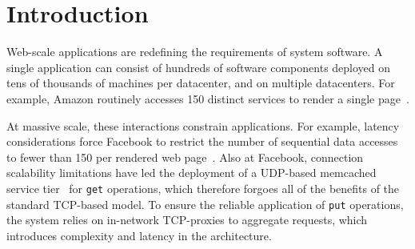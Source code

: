 
\section{Introduction}
\label{sec:intro}


Web-scale applications are redefining the requirements of system
software.  A single application can consist of hundreds of software
components deployed on tens of thousands of machines per datacenter,
and on multiple datacenters.  For example, Amazon routinely accesses
150 distinct services to render a single
page~\cite{DBLP:conf/sosp/DeCandiaHJKLPSVV07}.  


At massive scale, these interactions constrain applications.  For
example, latency considerations force Facebook to restrict the number
of sequential data accesses to fewer than 150 per rendered web
page~\cite{rumble2011s}.  Also at Facebook, connection scalability
limitations have led the deployment of a UDP-based memcached service
tier~\cite{nishtala2013scaling} for \texttt{get} operations, which
therefore forgoes all of the benefits of the standard TCP-based model.
To ensure the reliable application of \texttt{put} operations, the
system relies on in-network TCP-proxies to aggregate requests, which
introduces complexity and latency in the architecture.

